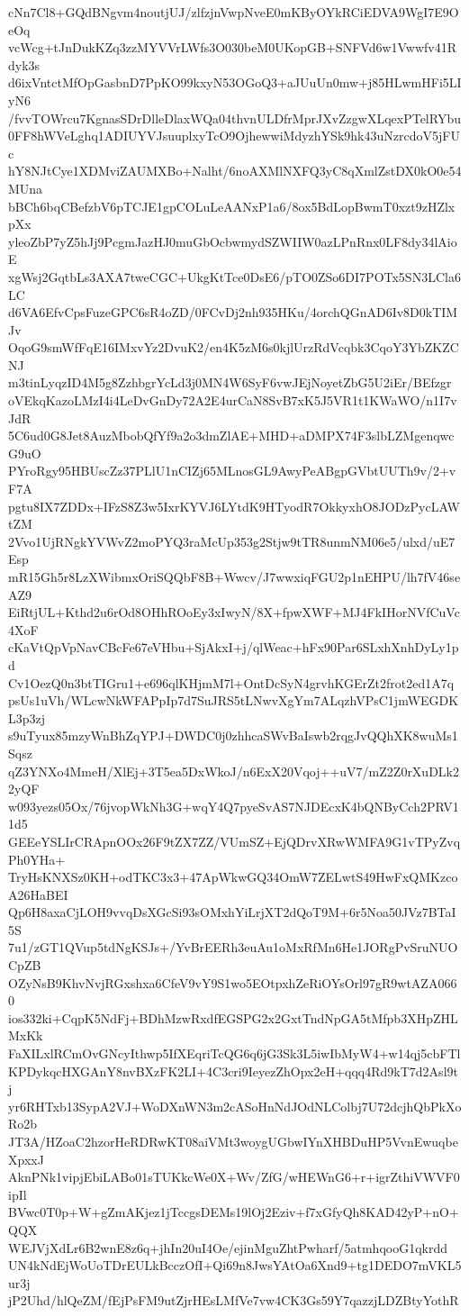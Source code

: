 cNn7Cl8+GQdBNgvm4noutjUJ/zlfzjnVwpNveE0mKByOYkRCiEDVA9WgI7E9OeOq
vcWcg+tJnDukKZq3zzMYVVrLWfs3O030beM0UKopGB+SNFVd6w1Vwwfv41Rdyk3s
d6ixVntctMfOpGasbnD7PpKO99kxyN53OGoQ3+aJUuUn0mw+j85HLwmHFi5LIyN6
/fvvTOWrcu7KgnasSDrDlleDlaxWQa04thvnULDfrMprJXvZzgwXLqexPTelRYbu
0FF8hWVeLghq1ADIUYVJsuuplxyTcO9OjhewwiMdyzhYSk9hk43uNzrcdoV5jFUc
hY8NJtCye1XDMviZAUMXBo+Nalht/6noAXMlNXFQ3yC8qXmlZstDX0kO0e54MUna
bBCh6bqCBefzbV6pTCJE1gpCOLuLeAANxP1a6/8ox5BdLopBwmT0xzt9zHZlxpXx
yleoZbP7yZ5hJj9PcgmJazHJ0muGbOcbwmydSZWIIW0azLPnRnx0LF8dy34lAioE
xgWsj2GqtbLs3AXA7tweCGC+UkgKtTce0DsE6/pTO0ZSo6DI7POTx5SN3LCla6LC
d6VA6EfvCpsFuzeGPC6sR4oZD/0FCvDj2nh935HKu/4orchQGnAD6Iv8D0kTIMJv
OqoG9smWfFqE16IMxvYz2DvuK2/en4K5zM6s0kjlUrzRdVcqbk3CqoY3YbZKZCNJ
m3tinLyqzID4M5g8ZzhbgrYcLd3j0MN4W6SyF6vwJEjNoyetZbG5U2iEr/BEfzgr
oVEkqKazoLMzI4i4LeDvGnDy72A2E4urCaN8SvB7xK5J5VR1t1KWaWO/n1I7vJdR
5C6ud0G8Jet8AuzMbobQfYf9a2o3dmZlAE+MHD+aDMPX74F3slbLZMgenqwcG9uO
PYroRgy95HBUscZz37PLlU1nCIZj65MLnosGL9AwyPeABgpGVbtUUTh9v/2+vF7A
pgtu8IX7ZDDx+IFzS8Z3w5IxrKYVJ6LYtdK9HTyodR7OkkyxhO8JODzPycLAWtZM
2Vvo1UjRNgkYVWvZ2moPYQ3raMcUp353g2Stjw9tTR8unmNM06e5/ulxd/uE7Esp
mR15Gh5r8LzXWibmxOriSQQbF8B+Wwcv/J7wwxiqFGU2p1nEHPU/lh7fV46seAZ9
EiRtjUL+Kthd2u6rOd8OHhROoEy3xIwyN/8X+fpwXWF+MJ4FkIHorNVfCuVc4XoF
cKaVtQpVpNavCBcFe67eVHbu+SjAkxI+j/qlWeac+hFx90Par6SLxhXnhDyLy1pd
Cv1OezQ0n3btTIGru1+e696qlKHjmM7l+OntDcSyN4grvhKGErZt2frot2ed1A7q
psUs1uVh/WLcwNkWFAPpIp7d7SuJRS5tLNwvXgYm7ALqzhVPsC1jmWEGDKL3p3zj
s9uTyux85mzyWnBhZqYPJ+DWDC0j0zhhcaSWvBaIswb2rqgJvQQhXK8wuMs1Sqsz
qZ3YNXo4MmeH/XlEj+3T5ea5DxWkoJ/n6ExX20Vqoj++uV7/mZ2Z0rXuDLk22yQF
w093yezs05Ox/76jvopWkNh3G+wqY4Q7pyeSvAS7NJDEcxK4bQNByCch2PRV11d5
GEEeYSLIrCRApnOOx26F9tZX7ZZ/VUmSZ+EjQDrvXRwWMFA9G1vTPyZvqPh0YHa+
TryHsKNXSz0KH+odTKC3x3+47ApWkwGQ34OmW7ZELwtS49HwFxQMKzcoA26HaBEI
Qp6H8axaCjLOH9vvqDsXGcSi93sOMxhYiLrjXT2dQoT9M+6r5Noa50JVz7BTaI5S
7u1/zGT1QVup5tdNgKSJs+/YvBrEERh3euAu1oMxRfMn6He1JORgPvSruNUOCpZB
OZyNsB9KhvNvjRGxshxa6CfeV9vY9S1wo5EOtpxhZeRiOYsOrl97gR9wtAZA0660
ios332ki+CqpK5NdFj+BDhMzwRxdfEGSPG2x2GxtTndNpGA5tMfpb3XHpZHLMxKk
FaXILxlRCmOvGNcyIthwp5IfXEqriTcQG6q6jG3Sk3L5iwIbMyW4+w14qj5cbFTl
KPDykqcHXGAnY8nvBXzFK2LI+4C3cri9IeyezZhOpx2eH+qqq4Rd9kT7d2Asl9tj
yr6RHTxb13SypA2VJ+WoDXnWN3m2cASoHnNdJOdNLColbj7U72dcjhQbPkXoRo2b
JT3A/HZoaC2hzorHeRDRwKT08aiVMt3woygUGbwIYnXHBDuHP5VvnEwuqbeXpxxJ
AknPNk1vipjEbiLABo01sTUKkcWe0X+Wv/ZfG/wHEWnG6+r+igrZthiVWVF0ipIl
BVwc0T0p+W+gZmAKjez1jTccgsDEMs19lOj2Eziv+f7xGfyQh8KAD42yP+nO+QQX
WEJVjXdLr6B2wnE8z6q+jhIn20uI4Oe/ejinMguZhtPwharf/5atmhqooG1qkrdd
UN4kNdEjWoUoTDrEULkBcczOfI+Qi69n8JwsYAtOa6Xnd9+tg1DEDO7mVKL5ur3j
jP2Uhd/hlQeZM/fEjPsFM9utZjrHEsLMfVe7vw4CK3Gs59Y7qazzjLDZBtyYothR
